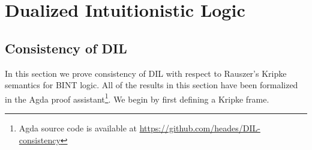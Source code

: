 \section{Dualized Intuitionistic Logic}
\label{sec:dualized_intuitionistic_logic}
\subsection{Consistency of DIL}
\label{subsec:consistency_of_dil}

In this section we prove consistency of DIL with respect to Rauszer's
Kripke semantics for BINT logic.  All of the results in this section
have been formalized in the Agda proof assistant\footnote{Agda source
  code is available at
  \url{https://github.com/heades/DIL-consistency}}.  We begin by first
defining a Kripke frame.

